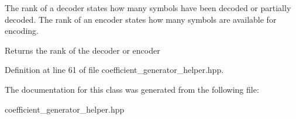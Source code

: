 The rank of a decoder states how many symbols have been decoded or partially decoded. The rank of an encoder states how many symbols are available for encoding. \begin{DoxyReturn}{Returns}
the rank of the decoder or encoder 
\end{DoxyReturn}


Definition at line 61 of file coefficient\-\_\-generator\-\_\-helper.\-hpp.



The documentation for this class was generated from the following file\-:\begin{DoxyCompactItemize}
\item 
coefficient\-\_\-generator\-\_\-helper.\-hpp\end{DoxyCompactItemize}
